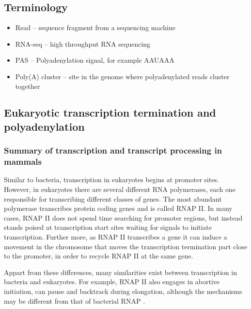 %


\subsection{Terminology}
\begin{itemize}
	\item Read -- sequence fragment from a sequencing machine
	\item RNA-seq -- high throughput RNA sequencing
	\item PAS -- Polyadenylation signal, for example AAUAAA
	\item Poly(A) cluster -- site in the genome where polyadenylated reads
		cluster together
\end{itemize}

\subsection{Eukaryotic transcription termination and polyadenylation}

\subsubsection{Summary of transcription and transcript processing in mammals}
Similar to bacteria, transcription in eukaryotes begins at promoter sites.
However, in eukaryotes there are several different RNA polymerases, each one
responsible for transcribing different classes of genes. The most abundant
polymerase transcribes protein coding genes and is called RNAP II. In many
cases, RNAP II does not spend time searching for promoter regions, but instead
stands poised at transcription start sites waiting for signals to initiate
transcription. Further more, as RNAP II transcribes a gene it can induce a
movement in the chromosome that moves the transcription termination part close
to the promoter, in order to recycle RNAP II at the same gene.

Appart from these differences, many similarities exist between transcription in
bacteria and eukaryotes. For example, RNAP II also engages in abortive
initiation, can pause and backtrack during elongation, although the mechanisms
may be different from that of bacterial RNAP \cite{wade_transition_2008}.


